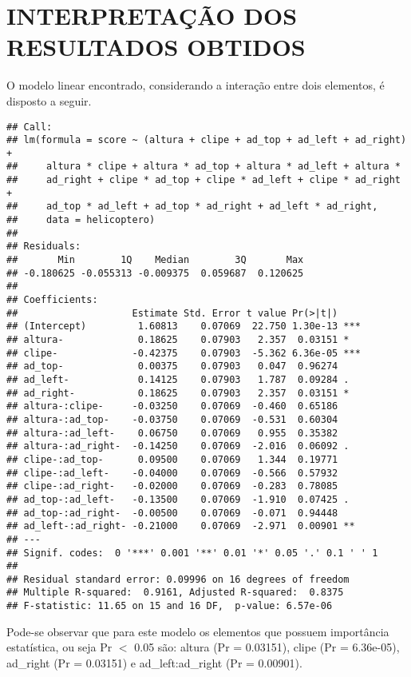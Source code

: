 \chapter{INTERPRETAÇÃO DOS RESULTADOS OBTIDOS}
O modelo linear encontrado, considerando a interação entre dois elementos, é disposto a seguir.

\begin{knitrout}
\color{fgcolor}\begin{kframe}
\begin{verbatim}
## Call:
## lm(formula = score ~ (altura + clipe + ad_top + ad_left + ad_right) + 
##     altura * clipe + altura * ad_top + altura * ad_left + altura * 
##     ad_right + clipe * ad_top + clipe * ad_left + clipe * ad_right + 
##     ad_top * ad_left + ad_top * ad_right + ad_left * ad_right, 
##     data = helicoptero)
## 
## Residuals:
##       Min        1Q    Median        3Q       Max 
## -0.180625 -0.055313 -0.009375  0.059687  0.120625 
## 
## Coefficients:
##                    Estimate Std. Error t value Pr(>|t|)    
## (Intercept)         1.60813    0.07069  22.750 1.30e-13 ***
## altura-             0.18625    0.07903   2.357  0.03151 *  
## clipe-             -0.42375    0.07903  -5.362 6.36e-05 ***
## ad_top-             0.00375    0.07903   0.047  0.96274    
## ad_left-            0.14125    0.07903   1.787  0.09284 .  
## ad_right-           0.18625    0.07903   2.357  0.03151 *  
## altura-:clipe-     -0.03250    0.07069  -0.460  0.65186    
## altura-:ad_top-    -0.03750    0.07069  -0.531  0.60304    
## altura-:ad_left-    0.06750    0.07069   0.955  0.35382    
## altura-:ad_right-  -0.14250    0.07069  -2.016  0.06092 .  
## clipe-:ad_top-      0.09500    0.07069   1.344  0.19771    
## clipe-:ad_left-    -0.04000    0.07069  -0.566  0.57932    
## clipe-:ad_right-   -0.02000    0.07069  -0.283  0.78085    
## ad_top-:ad_left-   -0.13500    0.07069  -1.910  0.07425 .  
## ad_top-:ad_right-  -0.00500    0.07069  -0.071  0.94448    
## ad_left-:ad_right- -0.21000    0.07069  -2.971  0.00901 ** 
## ---
## Signif. codes:  0 '***' 0.001 '**' 0.01 '*' 0.05 '.' 0.1 ' ' 1
## 
## Residual standard error: 0.09996 on 16 degrees of freedom
## Multiple R-squared:  0.9161,	Adjusted R-squared:  0.8375 
## F-statistic: 11.65 on 15 and 16 DF,  p-value: 6.57e-06
\end{verbatim}
\end{kframe}
\end{knitrout}

Pode-se observar que para este modelo os elementos que possuem importância estatística, ou seja Pr $<$ 0.05 são: altura (Pr = 0.03151), clipe (Pr = 6.36e-05), ad\_right (Pr = 0.03151) e ad\_left:ad\_right (Pr = 0.00901). 

